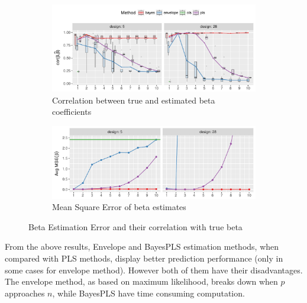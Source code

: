 \documentclass[a4paper, 11pt]{article}
\begin{document}
\begin{figure}[!ht]
  \centering
  \begin{subfigure}[b]{\textwidth}
    \centering
    \includegraphics[width=\textwidth]{beta-corr-plot-selected.pdf}
    \caption{Correlation between true and estimated beta coefficients}
    \label{fig:corr-beta}
  \end{subfigure}
  \begin{subfigure}[b]{\textwidth}
    \centering
    \includegraphics[width=\textwidth]{beta-error.pdf}
    \caption{Mean Square Error of beta estimates}
    \label{fig:beta-err}
  \end{subfigure}
  \caption{Beta Estimation Error and their correlation with true beta}
  \label{fig:est-error-combined}
\end{figure}

From the above results, Envelope and BayesPLS estimation methods, when compared with PLS methods, display better prediction performance (only in some cases for envelope method). However both of them have their disadvantages. The envelope method, as based on maximum likelihood, breaks down when $p$ approaches $n$, while BayesPLS have time consuming computation.%

\end{document}
